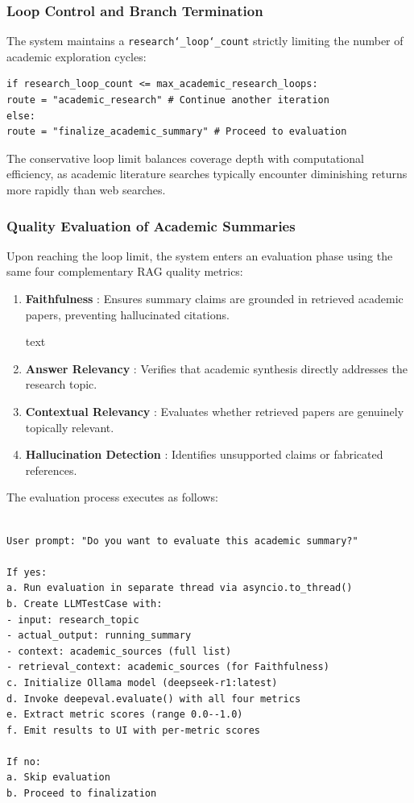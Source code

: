 \subsubsection{Loop Control and Branch Termination}

The system maintains a \texttt{research\char`_loop\char`_count}
 strictly limiting the number of academic exploration cycles:

\begin{lstlisting}
if research_loop_count <= max_academic_research_loops:
route = "academic_research" # Continue another iteration
else:
route = "finalize_academic_summary" # Proceed to evaluation
\end{lstlisting}

The conservative loop limit balances coverage depth with computational efficiency, as academic literature searches typically encounter diminishing returns more rapidly than web searches.

\subsubsection{Quality Evaluation of Academic Summaries}

Upon reaching the loop limit, the system enters an evaluation phase using the same four complementary RAG quality metrics:

\begin{enumerate}
\item \textbf{Faithfulness} : Ensures summary claims are grounded in retrieved academic papers, preventing hallucinated citations.

text
\item \textbf{Answer Relevancy} : Verifies that academic synthesis directly addresses the research topic.

\item \textbf{Contextual Relevancy} : Evaluates whether retrieved papers are genuinely topically relevant.

\item \textbf{Hallucination Detection} : Identifies unsupported claims or fabricated references.
\end{enumerate}

The evaluation process executes as follows:

\begin{lstlisting}

User prompt: "Do you want to evaluate this academic summary?"

If yes:
a. Run evaluation in separate thread via asyncio.to_thread()
b. Create LLMTestCase with:
- input: research_topic
- actual_output: running_summary
- context: academic_sources (full list)
- retrieval_context: academic_sources (for Faithfulness)
c. Initialize Ollama model (deepseek-r1:latest)
d. Invoke deepeval.evaluate() with all four metrics
e. Extract metric scores (range 0.0--1.0)
f. Emit results to UI with per-metric scores

If no:
a. Skip evaluation
b. Proceed to finalization
\end{lstlisting}

